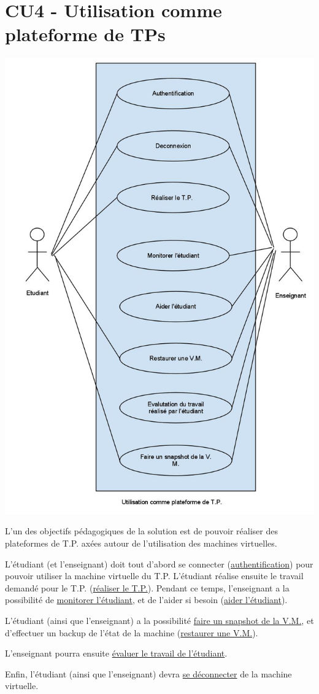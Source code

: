 \section{CU4 - Utilisation comme plateforme de TPs}

\includegraphics[scale=0.4]{CU4.jpg}

L’un des objectifs pédagogiques de la solution est de pouvoir réaliser des plateformes de T.P. axées autour de l’utilisation des machines virtuelles.

L’étudiant (et l’enseignant) doit tout d’abord se connecter (\underline{authentification}) pour pouvoir utiliser la machine virtuelle du T.P.
L’étudiant réalise ensuite le travail demandé pour le T.P. (\underline{réaliser le T.P.}). Pendant ce temps, l’enseignant a la possibilité de \underline{monitorer l’étudiant}, et de l’aider si besoin (\underline{aider l’étudiant}).

L’étudiant (ainsi que l’enseignant) a la possibilité \underline{faire un snapshot de la V.M.}, et d’effectuer un backup de l’état de la machine (\underline{restaurer une V.M.}).

L’enseignant pourra ensuite \underline{évaluer le travail de l’étudiant}.

Enfin, l’étudiant (ainsi que l’enseignant) devra \underline{se déconnecter} de la machine virtuelle.